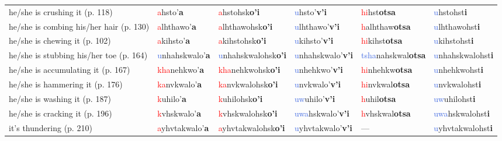 \documentclass[oneside,openany]{book}%
\begin{document}
\begin{tabularx}{\textwidth}{>{\hsize=1.5\hsize\RaggedRight}X >{\hsize=0.9\hsize}X >{\hsize=0.9\hsize}X >{\hsize=0.9\hsize}X >{\hsize=0.9\hsize}X >{\hsize=0.9\hsize}X}
he/she is crushing it (p. 118)&\textcolor{Red}{a}hsto'\textbf{a}&\textcolor{Red}{a}hstohsk\textbf{o'i}&\textcolor{RoyalBlue}{u}hsto'\textbf{v'i}&\textcolor{Red}{hi}hst\textbf{otsa}&\textcolor{RoyalBlue}{u}hstohst\textbf{i}\\%
he/she is combing his/her hair (p. 130)&\textcolor{Red}{a}lhthawo'\textbf{a}&\textcolor{Red}{a}lhthawohsk\textbf{o'i}&\textcolor{RoyalBlue}{u}lhthawo'\textbf{v'i}&\textcolor{Red}{h}alhthaw\textbf{otsa}&\textcolor{RoyalBlue}{u}lhthawohst\textbf{i}\\%
he/she is chewing it (p. 102)&\textcolor{Red}{a}kihsto'\textbf{a}&\textcolor{Red}{a}kihstohsk\textbf{o'i}&\textcolor{RoyalBlue}{u}kihsto'\textbf{v'i}&\textcolor{Red}{hi}kihst\textbf{otsa}&\textcolor{RoyalBlue}{u}kihstohst\textbf{i}\\%
he/she is stubbing his/her toe (p. 164)&\textcolor{RoyalBlue}{u}nhahskwalo'\textbf{a}&\textcolor{RoyalBlue}{u}nhahskwalohsk\textbf{o'i}&\textcolor{RoyalBlue}{u}nhahskwalo'\textbf{v'i}&\textcolor{RoyalBlue}{tsha}nahskwal\textbf{otsa}&\textcolor{RoyalBlue}{u}nhahskwalohst\textbf{i}\\%
he/she is accumulating it (p. 167)&\textcolor{Red}{kha}nehkwo'\textbf{a}&\textcolor{Red}{kha}nehkwohsk\textbf{o'i}&\textcolor{RoyalBlue}{u}nhehkwo'\textbf{v'i}&\textcolor{Red}{hi}nhehkw\textbf{otsa}&\textcolor{RoyalBlue}{u}nhehkwohst\textbf{i}\\%
he/she is hammering it (p. 176)&\textcolor{Red}{ka}nvkwalo'\textbf{a}&\textcolor{Red}{ka}nvkwalohsk\textbf{o'i}&\textcolor{RoyalBlue}{u}nvkwalo'\textbf{v'i}&\textcolor{Red}{hi}nvkwal\textbf{otsa}&\textcolor{RoyalBlue}{u}nvkwalohst\textbf{i}\\%
he/she is washing it (p. 187)&\textcolor{Red}{k}uhilo'\textbf{a}&\textcolor{Red}{k}uhilohsk\textbf{o'i}&\textcolor{RoyalBlue}{uw}uhilo'\textbf{v'i}&\textcolor{Red}{h}uhil\textbf{otsa}&\textcolor{RoyalBlue}{uw}uhilohst\textbf{i}\\%
he/she is cracking it (p. 196)&\textcolor{Red}{k}vhskwalo'\textbf{a}&\textcolor{Red}{k}vhskwalohsk\textbf{o'i}&\textcolor{RoyalBlue}{uwa}hskwalo'\textbf{v'i}&\textcolor{Red}{h}vhskwal\textbf{otsa}&\textcolor{RoyalBlue}{uwa}hskwalohst\textbf{i}\\%
it's thundering (p. 210)&\textcolor{Red}{a}yhvtakwalo'\textbf{a}&\textcolor{Red}{a}yhvtakwalohsk\textbf{o'i}&\textcolor{RoyalBlue}{u}yhvtakwalo'\textbf{v'i}&---&\textcolor{RoyalBlue}{u}yhvtakwalohst\textbf{i}\\%
\bottomrule%
\end{tabularx}%
\vspace{1em}%
\needspace{3in}%
\end{document}
